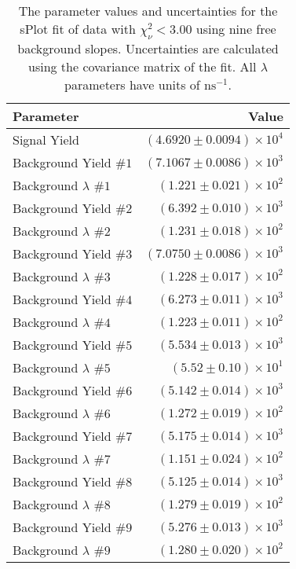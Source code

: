 
\begin{table}[h]
    \begin{center}
        \begin{tabular}{lr}\toprule
            Parameter & Value \\\midrule
            Signal Yield & $(4.6920 \pm 0.0094) \times 10^{4}$ \\
            Background Yield $\#1$ & $(7.1067 \pm 0.0086) \times 10^{3}$ \\
            Background $\lambda$ $\#1$ & $(1.221 \pm 0.021) \times 10^{2}$ \\
            Background Yield $\#2$ & $(6.392 \pm 0.010) \times 10^{3}$ \\
            Background $\lambda$ $\#2$ & $(1.231 \pm 0.018) \times 10^{2}$ \\
            Background Yield $\#3$ & $(7.0750 \pm 0.0086) \times 10^{3}$ \\
            Background $\lambda$ $\#3$ & $(1.228 \pm 0.017) \times 10^{2}$ \\
            Background Yield $\#4$ & $(6.273 \pm 0.011) \times 10^{3}$ \\
            Background $\lambda$ $\#4$ & $(1.223 \pm 0.011) \times 10^{2}$ \\
            Background Yield $\#5$ & $(5.534 \pm 0.013) \times 10^{3}$ \\
            Background $\lambda$ $\#5$ & $(5.52 \pm 0.10) \times 10^{1}$ \\
            Background Yield $\#6$ & $(5.142 \pm 0.014) \times 10^{3}$ \\
            Background $\lambda$ $\#6$ & $(1.272 \pm 0.019) \times 10^{2}$ \\
            Background Yield $\#7$ & $(5.175 \pm 0.014) \times 10^{3}$ \\
            Background $\lambda$ $\#7$ & $(1.151 \pm 0.024) \times 10^{2}$ \\
            Background Yield $\#8$ & $(5.125 \pm 0.014) \times 10^{3}$ \\
            Background $\lambda$ $\#8$ & $(1.279 \pm 0.019) \times 10^{2}$ \\
            Background Yield $\#9$ & $(5.276 \pm 0.013) \times 10^{3}$ \\
            Background $\lambda$ $\#9$ & $(1.280 \pm 0.020) \times 10^{2}$ \\\bottomrule
        \end{tabular}
        \caption{The parameter values and uncertainties for the sPlot fit of data with $\chi^2_\nu < 3.00$ using nine free background slopes. Uncertainties are calculated using the covariance matrix of the fit. All $\lambda$ parameters have units of $\si{\nano\second}^{-1}$.}
    \end{center}
\end{table}
